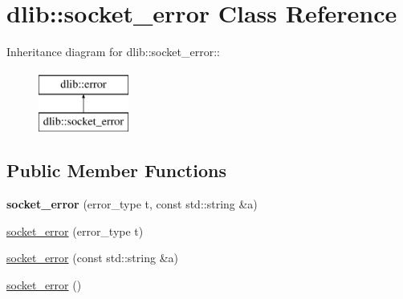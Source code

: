 \hypertarget{classdlib_1_1socket__error}{
\section{dlib::socket\_\-error Class Reference}
\label{classdlib_1_1socket__error}
}
Inheritance diagram for dlib::socket\_\-error::\begin{figure}[H]
\begin{center}
\leavevmode
\includegraphics[height=2cm]{classdlib_1_1socket__error}
\end{center}
\end{figure}
\subsection*{Public Member Functions}
\begin{DoxyCompactItemize}
\item 
\hypertarget{classdlib_1_1socket__error_a54067cec0e4569d70cadc1ec33eb9d44}{
{\bfseries socket\_\-error} (error\_\-type t, const std::string \&a)}
\label{classdlib_1_1socket__error_a54067cec0e4569d70cadc1ec33eb9d44}

\item 
\hyperlink{classdlib_1_1socket__error_a0a9b8d66ac787773c3e1d7e19421d6f2}{socket\_\-error} (error\_\-type t)
\item 
\hyperlink{classdlib_1_1socket__error_a894c0c5dbe99a8f6733b875e3913e54a}{socket\_\-error} (const std::string \&a)
\item 
\hyperlink{classdlib_1_1socket__error_a618d1588da7ee235b1d143ce177d5dd8}{socket\_\-error} ()
\end{DoxyCompactItemize}


